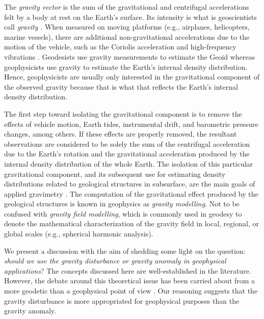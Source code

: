 \documentclass[extra]{gji}
\begin{document}
The \textit{gravity vector} is the sum of the gravitational and centrifugal
accelerations felt by a body at rest on the Earth's surface.
Its intensity is what is geoscientists call \textit{gravity}
\citep{heiskanen-moritz1967, hofmann-wellenhof-moritz2005}.
When measured on moving platforms (e.g., airplanes,
helicopters, marine vessels), there are additional
non-gravitational accelerations due to the motion of the vehicle,
such as the Coriolis acceleration and high-frequency vibrations
\citep{glennie-etal2000,nabighian-etal2005-grav,baumann-etal2012}.
Geodesists use gravity measurements to estimate the Geoid \citep{li2001}
whereas geophysicists use gravity to estimate the Earth's
internal density distribution.
Hence, geophysicists are usually only interested
in the gravitational component of the observed gravity
because that is what that reflects the Earth's internal density distribution.

The first step toward isolating the gravitational component
is to remove the effects of vehicle motion, Earth tides, instrumental drift,
and barometric pressure changes, among others.
If these effects are properly removed,
the resultant observations are considered to be solely
the sum of the centrifugal acceleration due to the Earth's rotation and
the gravitational acceleration produced by
the internal density distribution of the whole Earth.
The isolation of this particular gravitational component,
and its subsequent use for estimating density
distributions related to geological structures in subsurface,
are the main goals of applied gravimetry \citep{blakely1996}.
The computation of the gravitational effect produced by
the geological structures is known in geophysics as
\textit{gravity modelling}.
Not to be confused with \textit{gravity field modelling}, which
is commonly used in geodesy to denote the mathematical characterization of the
gravity field in local, regional, or global scales (e.g., spherical harmonic
analysis).

We present a discussion with the aim of shedding some light on the question:
\textit{should we use the gravity disturbance or gravity anomaly in geophysical
applications}?
The concepts discussed here are well-established in the literature.
However, the debate around this theoretical issue has been
carried about from a more geodetic than a geophysical point of view
\citep{lafehr1991,chapin1996,li2001,fairhead2003,
hackney-featherstone2003,hinze2005}.
Our reasoning suggests that the gravity disturbance is more appropriated for
geophysical purposes than the gravity anomaly.
\end{document}
